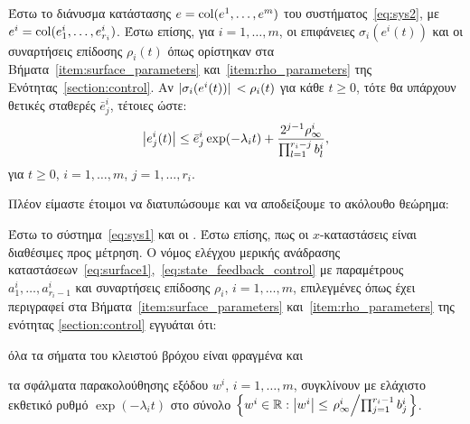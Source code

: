 \begin{lemma}{\cite{bechlioulis2013output}}
\label{lemma}
    Έστω το διάνυσμα κατάστασης $e = \operatorname{col}(e^1, \ldots, e^m)$ του συστήματος~\eqref{eq:sys2}, με $e^i = \operatorname{col}(e_1^i, \ldots, e_{r_i}^i)$. Έστω επίσης, για $i = 1, \ldots, m$, οι επιφάνειες $\sigma_i(e^i(t))$ και οι συναρτήσεις επίδοσης $\rho_i(t)$ όπως ορίστηκαν στα Βήματα~\ref{item:surface_parameters} και~\ref{item:rho_parameters} της Ενότητας~\ref{section:control}. Αν $\abs*{\sigma_i(e^i(t))} < \rho_i(t)$ για κάθε $t \geq 0$, τότε θα υπάρχουν θετικές σταθερές $\bar e_j^i$, τέτοιες ώστε:
    \[
    \abs{e_j^i(t)} \leq \bar e_j^i \exp(-\lambda_i t) + \frac{2^{j-1} \rho_\infty^i}{\prod_{l=1}^{r_i - j} b_l^i},
    \]
    για $t \geq 0$, $i = 1,\ldots,m$, $j = 1,\ldots, r_i$.
\end{lemma}

Πλέον είμαστε έτοιμοι να διατυπώσουμε και να αποδείξουμε το ακόλουθο θεώρημα:

\begin{theorem}
    \label{theorem_sf}
    Έστω το σύστημα~\eqref{eq:sys1} και οι . Έστω επίσης, πως οι $x$-καταστάσεις είναι διαθέσιμες προς μέτρηση. Ο νόμος ελέγχου μερικής ανάδρασης καταστάσεων~\eqref{eq:surface1},~\eqref{eq:state_feedback_control} με παραμέτρους $a_1^i, \ldots, a_{r_i-1}^i$ και συναρτήσεις επίδοσης $\rho_i$, $i = 1,\ldots, m$, επιλεγμένες όπως έχει περιγραφεί στα Βήματα~\ref{item:surface_parameters} και~\ref{item:rho_parameters} της ενότητας \cref{section:control} εγγυάται ότι:
    \begin{enumerate*}[label=(\alph*)]
        \item όλα τα σήματα του κλειστού βρόχου είναι φραγμένα και
        \item τα σφάλματα παρακολούθησης εξόδου $w^i$, $i = 1, \ldots, m$, συγκλίνουν με ελάχιστο εκθετικό ρυθμό  $\exp(-\lambda_i t)$ στο σύνολο $\qty{w^i \in \R: \abs{w^i} \leq \flatfrac{\rho_\infty^i}{\prod_{j=1}^{r_i-1} b_j^i}}$.
    \end{enumerate*}
\end{theorem}

